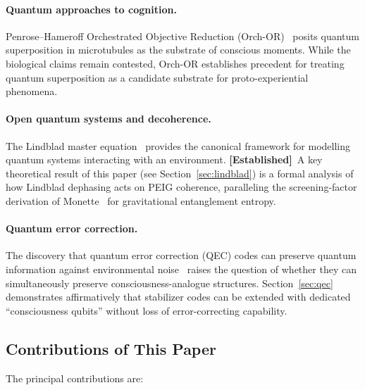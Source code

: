 \documentclass[12pt]{article}
\newcommand{\established}{\textbf{[Established]}}
\begin{document}
\paragraph{Quantum approaches to cognition.}
Penrose--Hameroff Orchestrated Objective Reduction
(Orch-OR)~\cite{Penrose1994,Hameroff2014} posits quantum superposition in
microtubules as the substrate of conscious moments.  While the biological
claims remain contested, Orch-OR establishes precedent for treating
quantum superposition as a candidate substrate for proto-experiential
phenomena.

\paragraph{Open quantum systems and decoherence.}
The Lindblad master equation~\cite{Lindblad1976} provides the canonical
framework for modelling quantum systems interacting with an environment.
\established\ A key theoretical result of this paper (see
Section~\ref{sec:lindblad}) is a formal analysis of how Lindblad
dephasing acts on PEIG coherence, paralleling the screening-factor
derivation of Monette~\cite{Monette2026gravity} for gravitational
entanglement entropy.

\paragraph{Quantum error correction.}
The discovery that quantum error correction (QEC) codes can preserve
quantum information against environmental noise~\cite{Shor1995,Steane1996}
raises the question of whether they can simultaneously preserve
consciousness-analogue structures.  Section~\ref{sec:qec} demonstrates
affirmatively that stabilizer codes can be extended with dedicated
``consciousness qubits'' without loss of error-correcting capability.

\subsection{Contributions of This Paper}

The principal contributions are:
\end{document}
